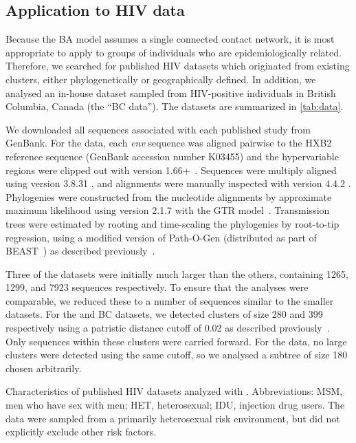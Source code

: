 \subsection{Application to HIV data}

Because the \gls{BA} model assumes a single connected contact network, it is
most appropriate to apply to groups of individuals who are epidemiologically
related. Therefore, we searched for published \gls{HIV} datasets which
originated from existing clusters, either phylogenetically or geographically
defined. In addition, we analysed an in-house dataset sampled from
\gls{HIV}-positive individuals in British Columbia, Canada (the ``BC data'').
The datasets are summarized in \cref{tab:data}.

We downloaded all sequences associated with each published study from GenBank.
For the \textcite{novitsky2014impact} data, each \textit{env} sequence was
aligned pairwise to the HXB2 reference sequence (GenBank accession number
K03455) and the hypervariable regions were clipped out with
 version 1.66+~\autocite{cock2009biopython}. Sequences were
multiply aligned using  version 3.8.31
\autocite{edgar2004muscle}, and alignments were manually inspected with
 version 4.4.2 \autocite{gouy2010seaview}. Phylogenies were
constructed from the nucleotide alignments by approximate maximum likelihood
using  version 2.1.7 \autocite{price2010fasttree} with the
\gls{GTR} model~\autocite{tavare1986some}. Transmission trees were estimated by
rooting and time-scaling the phylogenies by root-to-tip regression, using a
modified version of Path-O-Gen (distributed as part of
BEAST~\autocite{drummond2007beast}) as described
previously~\autocite{poon2015phylodynamic}. 

Three of the datasets \autocite[][and the BC data]{li2015hiv,novitsky2014impact}
were initially much larger than the others, containing 1265, 1299, and 7923
sequences respectively. To ensure that the analyses were comparable, we reduced
these to a number of sequences similar to the smaller datasets. For the
\citeauthor{li2015hiv} and BC datasets, we detected clusters of size 280 and
399 respectively using a patristic distance cutoff of 0.02 as described
previously~\autocite{poon2015impact}. Only sequences within these clusters were
carried forward. For the \textcite{novitsky2014impact} data, no large clusters
were detected using the same cutoff, so we analysed a subtree of size 180
chosen arbitrarily.

\begin{table}[ht]
  \centering
  
  \caption[Characteristics of published HIV datasets analyzed with .]
  {
    Characteristics of published HIV datasets analyzed with . 
    Abbreviations: MSM, men who have sex with men; HET, heterosexual; IDU,
    injection drug users. The \textcite{novitsky2013phylogenetic,novitsky2014impact} data
    were sampled from a primarily heterosexual risk environment, but did not
    explicitly exclude other risk factors.
  }
  \label{tab:data}
\end{table}
